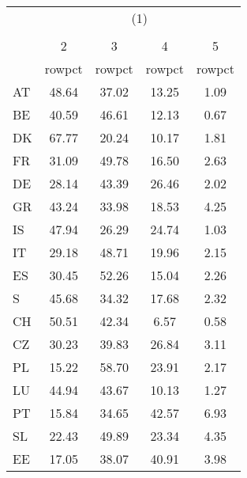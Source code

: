 {
\def\sym#1{\ifmmode^{#1}\else\(^{#1}\)\fi}
\begin{tabular}{l*{4}{c}}
\hline\hline
            &\multicolumn{4}{c}{(1)}                            \\
            &\multicolumn{4}{c}{}                               \\
            &           2&           3&           4&           5\\
            &      rowpct&      rowpct&      rowpct&      rowpct\\
\hline
AT          &       48.64&       37.02&       13.25&        1.09\\
BE          &       40.59&       46.61&       12.13&        0.67\\
DK          &       67.77&       20.24&       10.17&        1.81\\
FR          &       31.09&       49.78&       16.50&        2.63\\
DE          &       28.14&       43.39&       26.46&        2.02\\
GR          &       43.24&       33.98&       18.53&        4.25\\
IS          &       47.94&       26.29&       24.74&        1.03\\
IT          &       29.18&       48.71&       19.96&        2.15\\
ES          &       30.45&       52.26&       15.04&        2.26\\
S           &       45.68&       34.32&       17.68&        2.32\\
CH          &       50.51&       42.34&        6.57&        0.58\\
CZ          &       30.23&       39.83&       26.84&        3.11\\
PL          &       15.22&       58.70&       23.91&        2.17\\
LU          &       44.94&       43.67&       10.13&        1.27\\
PT          &       15.84&       34.65&       42.57&        6.93\\
SL          &       22.43&       49.89&       23.34&        4.35\\
EE          &       17.05&       38.07&       40.91&        3.98\\
\hline\hline
\end{tabular}
}
